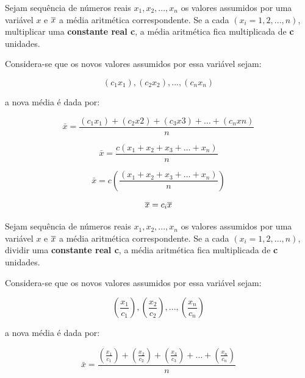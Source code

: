 \begin{enumerate}
\vskip0.3cm
\textbf{} 
\vskip0.3cm

Sejam sequência de números reais $x_{1}, x_{2},...,x_{n}$ os valores assumidos por uma variável $x$ e $\Bar{x}$ a média aritmética correspondente. Se a cada $(x_{i}=1,2,...,n)$, multiplicar uma \textbf{constante real c}, a média aritmética fica multiplicada de \textbf{c} unidades.\vskip0.3cm


Considera-se que os novos valores assumidos por essa variável sejam: 

$$(c_{1}x_{1}),(c_{2}x_{2}),...,(c_{n}x_{n})$$

a nova média é dada por:

\begin{equation*}\label{media3}
     \bar{x}=\frac{(c_{1}x_{1})+(c_{2}x{2})+(c_{3}x{3})+\ldots+(c_{n}x{n})}{n} 
\end{equation*}

\begin{equation*}\label{media3}
     \bar{x}=\frac{c(x_{1}+x_{2}+x_{3}+\ldots+x_{n})}{n} 
\end{equation*}

\begin{equation*}\label{media3}
     \bar{x}=c \left(\frac{(x_{1}+x_{2}+x_{3}+\ldots+x_{n})}{n} \right)
\end{equation*}


\begin{equation*}\label{media3}
     \bar{x}=c_{i}\Bar{x} 
\end{equation*}



\vskip0.3cm
\textbf{} 
\vskip0.3cm

Sejam sequência de números reais $x_{1}, x_{2},...,x_{n}$ os valores assumidos por uma variável $x$ e $\Bar{x}$ a média aritmética correspondente. Se a cada $(x_{i}=1,2,...,n)$, dividir uma \textbf{constante real c}, a média aritmética fica multiplicada de \textbf{c} unidades.\vskip0.3cm


Considera-se que os novos valores assumidos por essa variável sejam: 

$$\left( \frac{x_{1}}{c_{1}} \right), \left( \frac{x_{2}}{c_{2}} \right),..., \left( \frac{x_{n}}{c_{n}}\right)$$


a nova média é dada por:

\begin{equation*}\label{media3}
     \bar{x}= \frac{\left( \frac{x_{1}}{c_{1}} \right)+ \left( \frac{x_{2}}{c_{2}} \right)+ \left( \frac{x_{3}}{c_{3}}\right)+\ldots+\left( \frac{x_{n}}{c_{n}} \right)}{n}
\end{equation*}


\end{enumerate}

